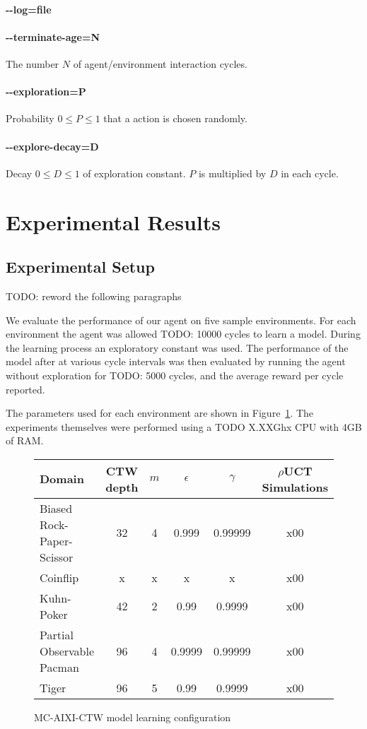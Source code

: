 \documentclass[paper=a4, fontsize=11pt]{scrartcl} %
\numberwithin{equation}{section} %
\numberwithin{figure}{section} %
\numberwithin{table}{section} %
\begin{document}
\paragraph{-{}-log=file}
\paragraph{-{}-terminate-age=N} The number $N$ of agent/environment interaction cycles.
\paragraph{-{}-exploration=P} Probability $0 \leq P \leq 1$ that a action is chosen randomly.
\paragraph{-{}-explore-decay=D} Decay $0 \leq D \leq 1$ of exploration constant. $P$ is multiplied by $D$ in each cycle.


\section{\label{results}Experimental Results}
\subsection{Experimental Setup}
TODO: reword the following paragraphs

We evaluate the performance of our agent on five sample environments. For each environment the agent was allowed TODO: 10000 cycles to learn a model. During the learning process an exploratory constant was used. The performance of the model after at various cycle intervals was then evaluated by running the agent without exploration for TODO: 5000 cycles, and the average reward per cycle reported.

The parameters used for each environment are shown in Figure~\ref{tab:setup}. The experiments themselves were performed using a TODO X.XXGhx CPU with 4GB of RAM.

\begin{figure}[H]
\centering
\begin{tabular}{|l|c|c|c|c|c|}
\hline
Domain & CTW depth & $m$ & $\epsilon$ & $\gamma$ & $\rho$UCT Simulations\\\hline
Biased Rock-Paper-Scissor & 32 & 4 & 0.999 & 0.99999 & x00\\
Coinflip & x & x & x & x & x00\\
Kuhn-Poker & 42 & 2 & 0.99 & 0.9999 & x00\\
Partial Observable Pacman & 96 & 4 & 0.9999 & 0.99999 & x00\\
Tiger & 96 & 5 & 0.99 & 0.9999 & x00\\\hline
\end{tabular}
\caption{\label{tab:setup}MC-AIXI-CTW model learning configuration}
\end{figure}
\end{document}

